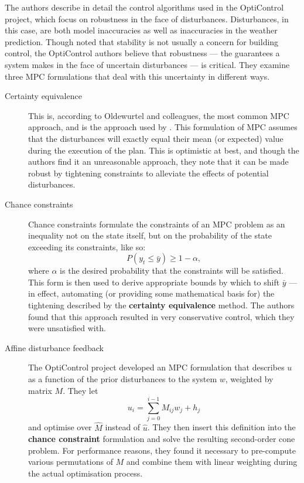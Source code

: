 
The authors describe in detail the control algorithms used in the OptiControl project, which focus on robustness in the face of disturbances.
Disturbances, in this case, are both model inaccuracies as well as inaccuracies in the weather prediction.
Though  noted that stability is not usually a concern for building control, the OptiControl authors believe that robustness --- the guarantees a system makes in the face of uncertain disturbances --- is critical.
They examine three MPC formulations that deal with this uncertainty in different ways.

\begin{description}
   \item[Certainty equivalence]
      This is, according to Oldewurtel and colleagues, the most common MPC approach, and is the approach used by .
      This formulation of MPC assumes that the disturbances will exactly equal their mean (or expected) value during the execution of the plan.
      This is optimistic at best, and though the authors find it an unreasonable approach, they note that it can be made robust by tightening constraints to alleviate the effects of potential disturbances.

   \item[Chance constraints]
      Chance constraints formulate the constraints of an MPC problem as an inequality not on the state itself, but on the probability of the state exceeding its constraints, like so:
      $$ P(y_t \leq \bar{y}) \geq 1 - \alpha, $$
      where $\alpha$ is the desired probability that the constraints will be satisfied.
      This form is then used to derive appropriate bounds by which to shift $\bar{y}$ --- in effect, automating (or providing some mathematical basis for) the tightening described by the {\bf certainty equivalence} method.
      The authors found that this approach resulted in very conservative control, which they were unsatisfied with.

   \item[Affine disturbance feedback]
      The OptiControl project developed an MPC formulation that describes $u$ as a function of the prior disturbances to the system $w$, weighted by matrix $M$.
      They let
      $$ u_i = \sum _{j=0} ^{i-1} M_{ij} w_j + h_j $$
      and optimise over $\hat{M}$ instead of $\hat{u}$.
      They then insert this definition into the {\bf chance constraint} formulation and solve the resulting second-order cone problem.
      For performance reasons, they found it necessary to pre-compute various permutations of $M$ and combine them with linear weighting during the actual optimisation process.
\end{description}

